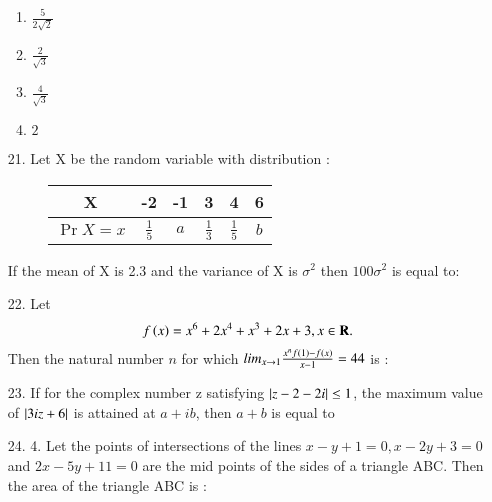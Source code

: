 \documentclass[journal,12pt,onecolumn]{IEEEtran}
\theoremstyle{remark}
\begin{document}
\begin{enumerate}
        \hfill{}
        \begin{enumerate}
            \item $\frac{5}{2\sqrt{2}}$ 
            \item $\frac{2}{\sqrt{3}}$ 
            \item $\frac{4}{\sqrt{3}}$  
            \item $2$
        \end{enumerate}
    \item[21.] Let X be the random variable with distribution : 
        \begin{figure}
            \centering
            \begin{tabular}[12pt]{ |c| c| c | c | c| c|}
                \hline
                X & -2 & -1 & 3 & 4 & 6\\ 
                \hline
                $\Pr{X = x}$  & $\frac{1}{5}$ & $a$ & $\frac{1}{3}$ & $\frac{1}{5}$ & $b$ \\
                \hline 
            \end{tabular}
        \end{figure}
        If the mean of X is 2.3 and the variance of X is $\sigma ^ 2$ then $100\sigma ^ 2$ is equal to:
        \hfill{}\\

    \item[22.] Let 
        \begin{align}
            f\left(x\right) = x^6 + 2x^4 + x^3 + 2x + 3, x \in \textbf{R}. 
        \end{align}
        Then the natural number $n$ for which $lim_{x \to 1} \frac{x^{n}f\left(1\right) - f\left(x\right)}{x - 1} = 44$ is :
        \hfill{}\\


    \item[23.] If for the complex number z satisfying $\left\vert z - 2 -2i\right\vert \le 1$, the maximum value of $\left\vert3iz + 6\right\vert$ is attained at $a + ib$, then $a + b$ is equal to
        \hfill{}\\


    \item[24.] 4. Let the points of intersections of the lines $x - y + 1 = 0, x -  2y + 3 = 0$ and $2x - 5y + 11 = 0$ are the mid points
        of the sides of a triangle ABC. Then the area of the triangle ABC is :
        \hfill{}\\



\end{enumerate}
\end{document}
